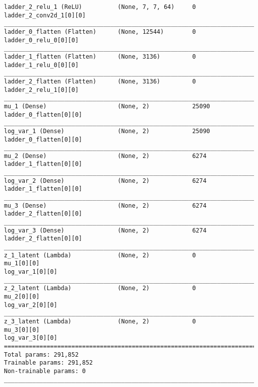 \begin{lstlisting}[caption={\textsc{Mnist}-\ac{VLAE}-factor-1 Encoder},captionpos=b,basicstyle=\tiny, label={lst:sparsity-vlae-encoder-28-fm1}]
ladder_2_relu_1 (ReLU)          (None, 7, 7, 64)     0           ladder_2_conv2d_1[0][0]
__________________________________________________________________________________________________
ladder_0_flatten (Flatten)      (None, 12544)        0           ladder_0_relu_0[0][0]
__________________________________________________________________________________________________
ladder_1_flatten (Flatten)      (None, 3136)         0           ladder_1_relu_0[0][0]
__________________________________________________________________________________________________
ladder_2_flatten (Flatten)      (None, 3136)         0           ladder_2_relu_1[0][0]
__________________________________________________________________________________________________
mu_1 (Dense)                    (None, 2)            25090       ladder_0_flatten[0][0]
__________________________________________________________________________________________________
log_var_1 (Dense)               (None, 2)            25090       ladder_0_flatten[0][0]
__________________________________________________________________________________________________
mu_2 (Dense)                    (None, 2)            6274        ladder_1_flatten[0][0]
__________________________________________________________________________________________________
log_var_2 (Dense)               (None, 2)            6274        ladder_1_flatten[0][0]
__________________________________________________________________________________________________
mu_3 (Dense)                    (None, 2)            6274        ladder_2_flatten[0][0]
__________________________________________________________________________________________________
log_var_3 (Dense)               (None, 2)            6274        ladder_2_flatten[0][0]
__________________________________________________________________________________________________
z_1_latent (Lambda)             (None, 2)            0           mu_1[0][0]
log_var_1[0][0]
__________________________________________________________________________________________________
z_2_latent (Lambda)             (None, 2)            0           mu_2[0][0]
log_var_2[0][0]
__________________________________________________________________________________________________
z_3_latent (Lambda)             (None, 2)            0           mu_3[0][0]
log_var_3[0][0]
==================================================================================================
Total params: 291,852
Trainable params: 291,852
Non-trainable params: 0
__________________________________________________________________________________________________
\end{lstlisting}